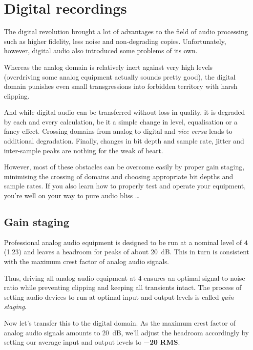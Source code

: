 \tableofcontents

\clearpage  %

\chapter{Digital recordings}
\label{chap:digital_recordings}

The digital revolution brought a lot of advantages to the field of
audio processing such as higher fidelity, less noise and non-degrading
copies.  Unfortunately, however, digital audio also introduced some
problems of its own.

Whereas the analog domain is relatively inert against very high levels
(overdriving some analog equipment actually sounds pretty good), the
digital domain punishes even small transgressions into forbidden
territory with harsh clipping.

And while digital audio can be transferred without loss in quality, it
is degraded by each and every calculation, be it a simple change in
level, equalisation or a fancy effect.  Crossing domains from analog
to digital and \emph{vice versa} leads to additional degradation.
Finally, changes in bit depth and sample rate, jitter and inter-sample
peaks are nothing for the weak of heart.

However, most of these obstacles can be overcome easily by proper gain
staging, minimising the crossing of domains and choosing appropriate
bit depths and sample rates.  If you also learn how to properly test
and operate your equipment, you're well on your way to pure audio
bliss \dots

\section{Gain staging}
\label{sec:gain_staging}

Professional analog audio equipment is designed to be run at a nominal
level of \textbf{\SI[addsign=all]{+4}{\dBu}} (\SI{1.23}{\VRMS}) and
leaves a headroom for peaks of about \SI{20}{\dB}.  This in turn is
consistent with the maximum crest factor of analog audio signals.

Thus, driving all analog audio equipment at \SI[addsign=all]{+4}{\dBu}
ensures an optimal signal-to-noise ratio while preventing clipping and
keeping all transients intact.  The process of setting audio devices
to run at optimal input and output levels is called \emph{gain
  staging}.

Now let's transfer this to the digital domain.  As the maximum crest
factor of analog audio signals amounts to \SI{20}{\dB}, we'll adjust
the headroom accordingly by setting our average input and output
levels to \textbf{\SI{-20}{\dBFS} RMS}.

